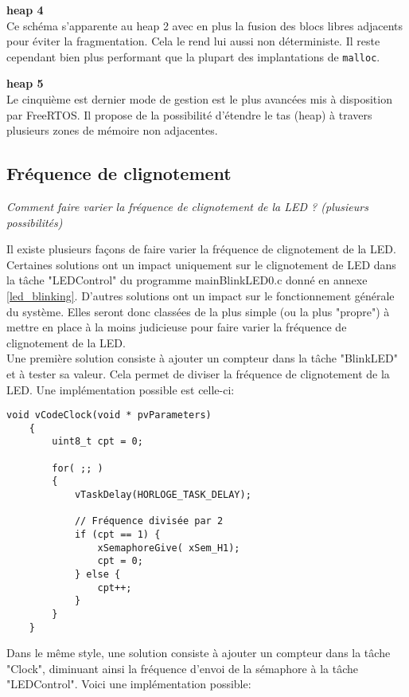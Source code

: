 \noindent
\textbf{heap 4} \\
Ce schéma s'apparente au heap 2 avec en plus la fusion des blocs libres adjacents pour éviter la fragmentation.
Cela le rend lui aussi non déterministe.
Il reste cependant bien plus performant que la plupart des implantations de \texttt{malloc}.

\noindent
\textbf{heap 5} \\
Le cinquième est dernier mode de gestion est le plus avancées mis à disposition par FreeRTOS.
Il propose de la possibilité d'étendre le tas (heap) à travers plusieurs zones de mémoire non adjacentes.


\subsection{Fréquence de clignotement}

\textit{Comment faire varier la fréquence de clignotement de la LED ? (plusieurs possibilités)}
\gap

Il existe plusieurs façons de faire varier la fréquence de clignotement de la LED.
Certaines solutions ont un impact uniquement sur le clignotement de LED dans la tâche "LEDControl" du programme mainBlinkLED0.c donné en annexe \ref{led_blinking}.
D'autres solutions ont un impact sur le fonctionnement générale du système.
Elles seront donc classées de la plus simple (ou la plus "propre") à mettre en place à la moins judicieuse pour faire varier la fréquence de clignotement de la LED. \\
Une première solution consiste à ajouter un compteur dans la tâche "BlinkLED" et à tester sa valeur.
Cela permet de diviser la fréquence de clignotement de la LED.
Une implémentation possible est celle-ci:

\begin{lstlisting}[style=CStyle]
    void vCodeClock(void * pvParameters)
    {
        uint8_t cpt = 0;

        for( ;; )
        {
            vTaskDelay(HORLOGE_TASK_DELAY);
            
            // Fréquence divisée par 2
            if (cpt == 1) {
                xSemaphoreGive( xSem_H1);
                cpt = 0;
            } else {
                cpt++;
            }
        }
    }
\end{lstlisting}

Dans le même style, une solution consiste à ajouter un compteur dans la tâche "Clock", diminuant ainsi la fréquence d'envoi de la sémaphore à la tâche "LEDControl".
Voici une implémentation possible:


